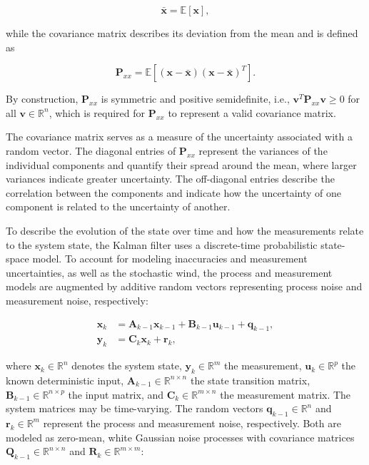 \begin{equation}
	\bm{\bar{x}} = \mathbb{E}[\bm{x}],
\end{equation}

while the covariance matrix describes its deviation from the mean and is defined as

\begin{equation}
	\bm{P}_{xx}
	=
	\mathbb{E}
	\left[
	(\bm{x} - \bm{\bar{x}})
	(\bm{x} - \bm{\bar{x}})^T
	\right].
\end{equation}

By construction, $\bm{P}_{xx}$ is symmetric and positive semidefinite, i.e., $\bm{v}^T \bm{P}_{xx} \bm{v} \geq 0$ for all $\bm{v} \in \mathbb{R}^n$, which is required for $\bm{P}_{xx}$ to represent a valid covariance matrix.

The covariance matrix serves as a measure of the uncertainty associated with a random vector. The diagonal entries of $\bm{P}_{xx}$ represent the variances of the individual components and quantify their spread around the mean, where larger variances indicate greater uncertainty. The off-diagonal entries describe the correlation between the components and indicate how the uncertainty of one component is related to the uncertainty of another.

To describe the evolution of the state over time and how the measurements relate to the system state, the Kalman filter uses a discrete-time probabilistic state-space model. 
To account for modeling inaccuracies and measurement uncertainties, as well as the stochastic wind, the process and measurement models are augmented by additive random vectors representing process noise and measurement noise, respectively:

\begin{align}
	\bm{x}_k 
	&= 
	\bm{A}_{k-1} \bm{x}_{k-1} + \bm{B}_{k-1} \bm{u}_{k-1} +
	\label{eq:discrete_system} 
	\bm{q}_{k-1}, 
	\\[4pt]
	\bm{y}_k 
	&= 
	\bm{C}_k \bm{x}_k + \bm{r}_k,
	\label{eq:discrete_system_output}
\end{align}

where $\bm{x}_k \in \mathbb{R}^n$ denotes the system state, $\bm{y}_k \in \mathbb{R}^m$ the measurement, $\bm{u}_k \in \mathbb{R}^p$ the known deterministic input, $\bm{A}_{k-1} \in \mathbb{R}^{n \times n}$ the state transition matrix, $\bm{B}_{k-1} \in \mathbb{R}^{n \times p}$ the input matrix, and $\bm{C}_k \in \mathbb{R}^{m \times n}$ the measurement matrix. The system matrices may be time-varying.
The random vectors $\bm{q}_{k-1} \in \mathbb{R}^{n}$ and $\bm{r}_k \in \mathbb{R}^{m}$ represent the process and measurement noise, respectively. Both are modeled as zero-mean, white Gaussian noise processes with covariance matrices $\bm{Q}_{k-1} \in \mathbb{R}^{n \times n}$ and $\bm{R}_k \in \mathbb{R}^{m \times m}$:

